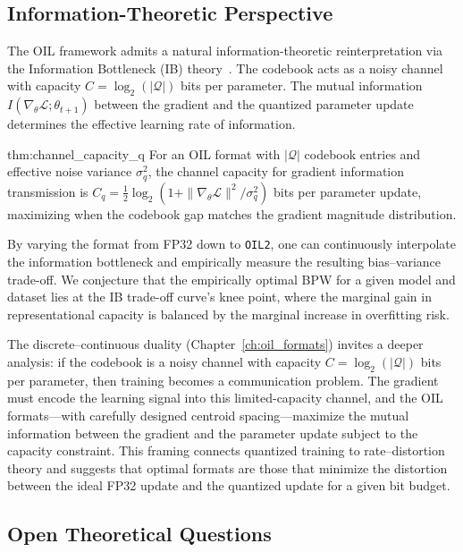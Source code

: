 \subsection{Information-Theoretic Perspective}

The OIL framework admits a natural information-theoretic reinterpretation via the Information Bottleneck (IB) theory~\cite{tishby2000}. The codebook acts as a noisy channel with capacity $C = \log_2(|\mathcal{Q}|)$ bits per parameter. The mutual information $I(\nabla_\theta \mathcal{L}; \theta_{t+1})$ between the gradient and the quantized parameter update determines the effective learning rate of information.

\begin{mythm}{thm:channel_capacity_q}
For an OIL format with $|\mathcal{Q}|$ codebook entries and effective noise variance $\sigma^2_q$, the channel capacity for gradient information transmission is $C_q = \frac{1}{2}\log_2(1 + \|\nabla_\theta \mathcal{L}\|^2 / \sigma^2_q)$ bits per parameter update, maximizing when the codebook gap matches the gradient magnitude distribution.
\end{mythm}

By varying the format from FP32 down to \texttt{OIL2}, one can continuously interpolate the information bottleneck and empirically measure the resulting bias--variance trade-off. We conjecture that the empirically optimal BPW for a given model and dataset lies at the IB trade-off curve's knee point, where the marginal gain in representational capacity is balanced by the marginal increase in overfitting risk.

The discrete--continuous duality (Chapter~\ref{ch:oil_formats}) invites a deeper analysis: if the codebook is a noisy channel with capacity $C = \log_2(|\mathcal{Q}|)$ bits per parameter, then training becomes a communication problem. The gradient must encode the learning signal into this limited-capacity channel, and the OIL formats---with carefully designed centroid spacing---maximize the mutual information between the gradient and the parameter update subject to the capacity constraint. This framing connects quantized training to rate--distortion theory and suggests that optimal formats are those that minimize the distortion between the ideal FP32 update and the quantized update for a given bit budget.

\subsection{Open Theoretical Questions}

